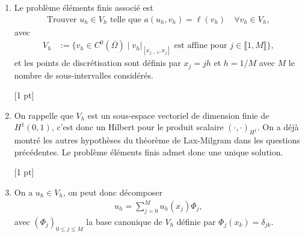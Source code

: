 \documentclass[12pt]{article}
\begin{document}
\begin{cor}
\begin{enumerate}
    $\bullet$ $a$ est coercive car
    pour $v \in H^1(0,1)$, on a $a(v,v) = \int_0^1 (v')^2 dx + v(0)^2 + v(1)^2$.
    Donc $\| v' \|_{L^2}^2 = \int_0^1 (v')^2 \leq a(v,v)$.
    De plus, l'in\'egalit\'e de Poincar\'e correspond \`a
    \begin{align*}
      \| v \|_{L^2}^2 \leq C a(v,v) .
    \end{align*}
    On a donc
    \begin{align*}
      \| v \|_{H^1}^2 = \| v \|_{L^2}^2 + \| v' \|_{L^2}^2
      \leq (1+C) a(v,v) .
    \end{align*}
    La forme bilin\'eaire $a$ est donc coercive.
    

    En appliquant le th\'eor\`eme de Lax-Milgram, le probl\`eme~\eqref{eq:pb_var}
    admet une unique solution.
    
    [4 pts]

  \item Le probl\`eme \'el\'ements finis associ\'e est
    \begin{align*}
      \text{Trouver } u_h \in V_{h} \text{ telle que }
      a(u_h , v_h) = \ell(v_h) \quad \forall v_h \in V_{h} ,
    \end{align*}
    avec
    \begin{align*}
      V_{h}
      &:= \{ v_h \in C^0(\overline{\Omega}) \; | \; v_h \vert_{[x_{j-1} , x_{j}]} \text{ est affine pour }
         j \in \llbracket 1,M \rrbracket \} ,
    \end{align*}
    et les points de discr\'etisation sont d\'efinis par $x_j = jh$ et $h = 1/M$
    avec $M$ le nombre de sous-intervalles consid\'er\'es.

    [1 pt]
    
  \item On rappelle que $V_{h}$ est un sous-espace vectoriel de dimension finie de $H^1(0,1)$,
    c'est donc un Hilbert pour le produit scalaire $(\cdot,\cdot)_{H^1}$.
    On a d\'ej\`a montr\'e les autres hypoth\`eses du th\'eor\`eme de Lax-Milgram
    dans les questions pr\'ec\'edentes.
    Le probl\`eme \'el\'ements finis admet donc une unique solution.

    [1 pt]

  \item On a $u_h \in V_{h}$, on peut donc d\'ecomposer
    \begin{align*}
      u_h = \sum_{j=0}^{M} u_h(x_j) \Phi_j ,
    \end{align*}
    avec $(\Phi_j)_{0 \leq j \leq M}$ la base canonique de $V_{h}$ d\'efinie par
    $\Phi_j(x_k) = \delta_{jk}$.


\end{enumerate}
\end{cor}
\end{document}
